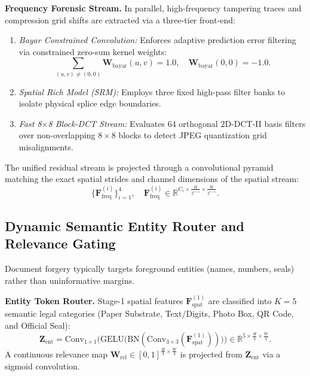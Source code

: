 \noindent\textbf{Frequency Forensic Stream.} 
In parallel, high-frequency tampering traces and compression grid shifts are extracted via a three-tier front-end:
\begin{enumerate}
    \item \textit{Bayar Constrained Convolution:} Enforces adaptive prediction error filtering via constrained zero-sum kernel weights:
    \begin{equation}
        \sum_{(u,v) \neq (0,0)} \mathbf{W}_{\text{bayar}}(u, v) = 1.0, \quad \mathbf{W}_{\text{bayar}}(0, 0) = -1.0.
    \end{equation}
    \item \textit{Spatial Rich Model (SRM):} Employs three fixed high-pass filter banks to isolate physical splice edge boundaries.
    \item \textit{Fast 8$\times$8 Block-DCT Stream:} Evaluates 64 orthogonal 2D-DCT-II basis filters over non-overlapping $8 \times 8$ blocks to detect JPEG quantization grid misalignments.
\end{enumerate}
The unified residual stream is projected through a convolutional pyramid matching the exact spatial strides and channel dimensions of the spatial stream:
\begin{equation}
    \{\mathbf{F}_{\text{freq}}^{(i)}\}_{i=1}^4, \quad \mathbf{F}_{\text{freq}}^{(i)} \in \mathbb{R}^{C_i \times \frac{H}{2^{i+1}} \times \frac{W}{2^{i+1}}}.
\end{equation}

\subsection{Dynamic Semantic Entity Router and Relevance Gating}
\label{subsec:entity_router}

Document forgery typically targets foreground entities (names, numbers, seals) rather than uninformative margins.

\noindent\textbf{Entity Token Router.}
Stage-1 spatial features $\mathbf{F}_{\text{spat}}^{(1)}$ are classified into $K=5$ semantic legal categories (Paper Substrate, Text/Digits, Photo Box, QR Code, and Official Seal):
\begin{equation}
    \mathbf{Z}_{\text{ent}} = \text{Conv}_{1 \times 1}\Big(\text{GELU}\big(\text{BN}(\text{Conv}_{3 \times 3}(\mathbf{F}_{\text{spat}}^{(1)}))\big)\Big) \in \mathbb{R}^{5 \times \frac{H}{4} \times \frac{W}{4}}.
\end{equation}
A continuous relevance map $\mathbf{W}_{\text{rel}} \in [0, 1]^{\frac{H}{4} \times \frac{W}{4}}$ is projected from $\mathbf{Z}_{\text{ent}}$ via a sigmoid convolution.

